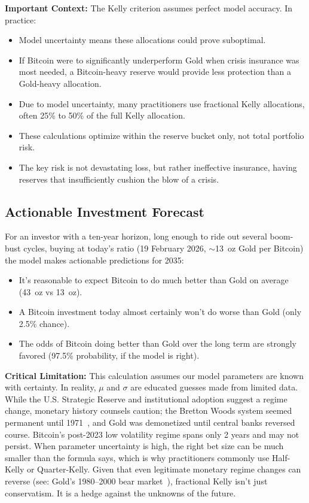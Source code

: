 \documentclass[11pt,letterpaper]{article}
\begin{document}
\textbf{Important Context:} The Kelly criterion assumes perfect model accuracy. In practice:
\begin{itemize}
    \item Model uncertainty means these allocations could prove suboptimal.
    \item If Bitcoin were to significantly underperform Gold when crisis insurance was most needed, a Bitcoin-heavy reserve would provide less protection than a Gold-heavy allocation.
    \item Due to model uncertainty, many practitioners use fractional Kelly allocations, often 25\% to 50\% of the full Kelly allocation.
    \item These calculations optimize within the reserve bucket only, not total portfolio risk.
    \item The key risk is not devastating loss, but rather ineffective insurance, having reserves that insufficiently cushion the blow of a crisis.
\end{itemize}

\subsection{Actionable Investment Forecast}

For an investor with a ten-year horizon, long enough to ride out several boom-bust cycles, buying at today's ratio (19 February 2026, $\sim$13~oz Gold per Bitcoin) the model makes actionable predictions for 2035:
\begin{itemize}
    \item It's reasonable to expect Bitcoin to do much better than Gold on average (43~oz vs 13~oz).
    \item A Bitcoin investment today almost certainly won't do worse than Gold (only 2.5\% chance).
    \item The odds of Bitcoin doing better than Gold over the long term are strongly favored (97.5\% probability, if the model is right).
\end{itemize}

\textbf{Critical Limitation:} This calculation assumes our model parameters are known with certainty. In reality, $\mu$ and $\sigma$ are educated guesses made from limited data. While the U.S. Strategic Reserve and institutional adoption suggest a regime change, monetary history counsels caution; the Bretton Woods system seemed permanent until 1971~\cite{bordo1993}, and Gold was demonetized until central banks reversed course. Bitcoin's post-2023 low volatility regime spans only 2 years and may not persist. When parameter uncertainty is high, the right bet size can be much smaller than the formula says, which is why practitioners commonly use Half-Kelly or Quarter-Kelly. Given that even legitimate monetary regime changes can reverse (see: Gold's 1980--2000 bear market~\cite{wgc2024prices}), fractional Kelly isn't just conservatism. It is a hedge against the unknowns of the future.
\end{document}
